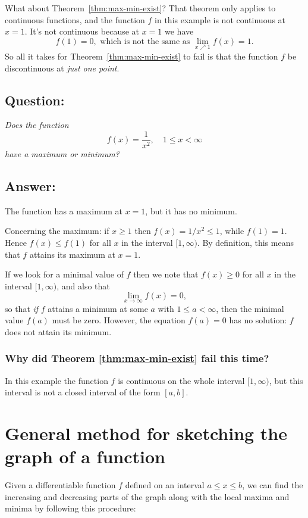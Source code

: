 What about Theorem~\ref{thm:max-min-exist}?  That theorem only applies to
continuous functions, and the function $f$ in this example is not continuous at
$x=1$.  It's not continuous because at $x=1$ we have
\[
f(1) = 0, \text{ which is not the same as } \lim_{x\nearrow1} f(x)=1.
\]
So all it takes for Theorem~\ref{thm:max-min-exist} to fail is that
the function $f$ be discontinuous at \textit{just one point}.




\subsection{Question: } %
\itshape Does the function
\[
f(x) = \frac1{x^2}, \quad 1\leq x<\infty
\]
have a maximum or minimum?\upshape




\subsection*{Answer: } %
The function has a maximum at $x=1$, but it has no
minimum.




Concerning the maximum: if $x\geq 1$ then $f(x) = 1/{x^2}\leq1$, while
$f(1) = 1$.  Hence $f(x)\leq f(1)$ for all $x$ in the interval $[1,
\infty)$. By definition, this means that $f$ attains its maximum at
$x=1$.








If we look for a minimal value of $f$ then we note that $f(x)\geq0$ for all $x$
in the interval $[1,\infty)$, and also that
\[
\lim_{x\to\infty} f(x) = 0,
\]
so that \emph{if} $f$ attains a minimum at some $a$ with $1\leq a<\infty$, then
the minimal value $f(a)$ must be zero.  However, the equation $f(a) = 0$ has no
solution: $f$ does not attain its minimum.








\subsubsection*{Why did Theorem \ref{thm:max-min-exist} fail this time? }
In this example the function $f$ is continuous on the whole interval
$[1,\infty)$, but this interval is not a closed interval of the
form $[a,b]$.




\section{General method for sketching the graph of a function} %
Given a differentiable function $f$ defined on an interval $a\leq x\leq b$,
we can find the increasing and decreasing parts of the graph along with the local maxima and minima by following this procedure:




